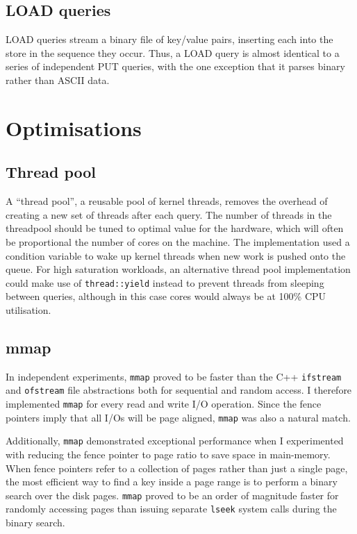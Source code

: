\documentclass{acm}
\begin{document}
\subsection{LOAD queries}

LOAD queries stream a binary file of key/value pairs, inserting each into the store in the sequence they occur. Thus, a LOAD query is almost identical to a series of independent PUT queries, with the one exception that it parses binary rather than ASCII data.

\section{Optimisations}

\subsection{Thread pool}

A ``thread pool'', a reusable pool of kernel threads, removes the overhead of creating a new set of threads after each query. The number of threads in the threadpool should be tuned to optimal value for the hardware, which will often be proportional the number of cores on the machine. The implementation used a condition variable to wake up kernel threads when new work is pushed onto the queue. For high saturation workloads, an alternative thread pool implementation could make use of \texttt{thread::yield} instead to prevent threads from sleeping between queries, although in this case cores would always be at 100\% CPU utilisation.

\subsection{mmap}

In independent experiments, \texttt{mmap} proved to be faster than the C++ \texttt{ifstream} and \texttt{ofstream} file abstractions both for sequential and random access. I therefore implemented \texttt{mmap} for every read and write I/O operation. Since the fence pointers imply that all I/Os will be page aligned, \texttt{mmap} was also a natural match.

Additionally, \texttt{mmap} demonstrated exceptional performance when I experimented with reducing the fence pointer to page ratio to save space in main-memory. When fence pointers refer to a collection of pages rather than just a single page, the most efficient way to find a key inside a page range is to perform a binary search over the disk pages. \texttt{mmap} proved to be an order of magnitude faster for randomly accessing pages than issuing separate \texttt{lseek} system calls during the binary search.
\end{document}
